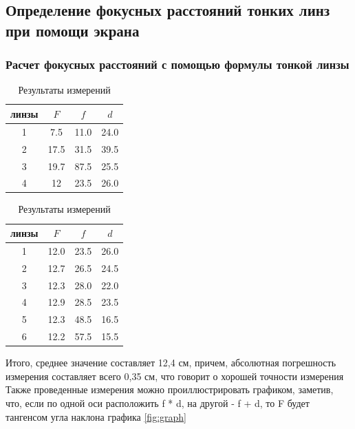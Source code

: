 \documentclass[
a4paper, %
12pt, %
]{article}
\begin{document}
	
	\subsection{Определение фокусных расстояний тонких линз при помощи экрана}	
	
	\subsubsection{Расчет фокусных расстояний с помощью формулы тонкой линзы}
	
	\begin{table}[h]
		\centering
		\begin{tabular}[H]{|c|c|c|c|}
			\hline
			\textnumero\; линзы & $F$ & $f$ & $d$\\
			\hline
			1 & 7.5 & 11.0 & 24.0 \\
			\hline
			2 & 17.5 & 31.5 & 39.5 \\
			\hline
			3 & 19.7 & 87.5 & 25.5 \\
			\hline	
			4 & 12 & 23.5 & 26.0 \\
			\hline
		\end{tabular}
		\caption{Результаты измерений}
	\end{table}
	
	\begin{table}[h!]
		\centering
		\begin{tabular}[H]{|c|c|c|c|}
			\hline
			\textnumero\; линзы & $F$ & $f$ & $d$\\
			\hline
			1 & 12.0 & 23.5 & 26.0 \\
			\hline
			2 & 12.7 & 26.5 & 24.5 \\
			\hline
			3 & 12.3 & 28.0 & 22.0 \\
			\hline	
			4 & 12.9 & 28.5 & 23.5 \\
			\hline
			5 & 12.3 & 48.5 & 16.5 \\
			\hline
			6 & 12.2 & 57.5 & 15.5 \\
			\hline
		\end{tabular}
		\caption{Результаты измерений}
	\end{table}
	
	Итого, среднее значение составляет 12,4 см, причем, абсолютная погрешность измерения составляет всего 0,35 см, что говорит о хорошей точности измерения
	Также проведенные измерения можно проиллюстрировать графиком, заметив, что,
	если по одной оси расположить f * d, на другой - f + d, то F будет тангенсом угла
	наклона графика \ref{fig:graph}
	
	\newpage
	
\end{document}
